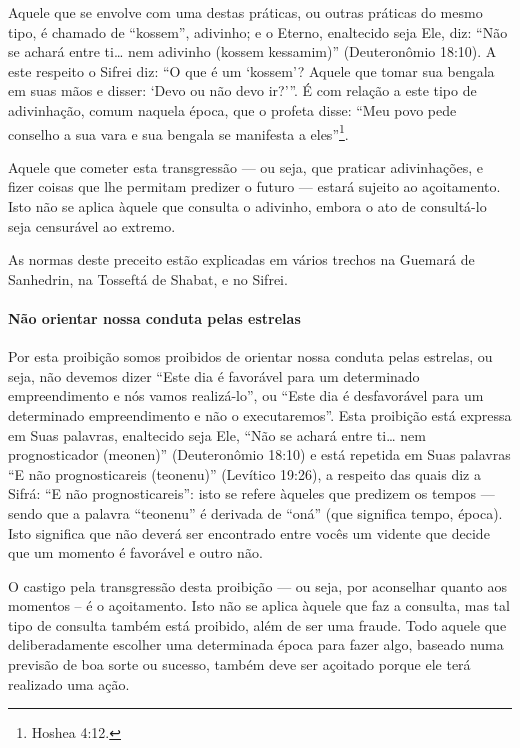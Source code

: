 Aquele que se envolve com uma destas práticas, ou outras práticas do
mesmo tipo, é chamado de ``kossem'', adivinho; e o Eterno, enaltecido
seja Ele, diz: ``Não se achará entre ti\ldots{} nem adivinho (kossem
kessamim)'' (Deuteronômio 18:10). A este respeito o Sifrei diz: ``O que
é um `kossem'? Aquele que tomar sua bengala em suas mãos e disser: `Devo
ou não devo ir?'''. É com relação a este tipo de adivinhação, comum
naquela época, que o profeta disse: ``Meu povo pede conselho a sua vara
e sua bengala se manifesta a eles''\footnote{Hoshea 4:12.}.

Aquele que cometer esta transgressão --- ou seja, que praticar
adivinhações, e fizer coisas que lhe permitam predizer o futuro ---
estará sujeito ao açoitamento. Isto não se aplica àquele que consulta o
adivinho, embora o ato de consultá-lo seja censurável ao extremo.

As normas deste preceito estão explicadas em vários trechos na Guemará
de Sanhedrin, na Tosseftá de Shabat, e no Sifrei.

\paragraph{Não orientar nossa conduta pelas estrelas}

Por esta proibição somos proibidos de orientar nossa conduta pelas
estrelas, ou seja, não devemos dizer ``Este dia é favorável para um
determinado empreendimento e nós vamos realizá-lo'', ou ``Este dia é
desfavorável para um determinado empreendimento e não o executaremos''.
Esta proibição está expressa em Suas palavras, enaltecido seja Ele,
``Não se achará entre ti\ldots{} nem prognosticador (meonen)'' (Deuteronômio
18:10) e está repetida em Suas palavras ``E não prognosticareis
(teonenu)'' (Levítico 19:26), a respeito das quais diz a Sifrá: ``E não
prognosticareis'': isto se refere àqueles que predizem os tempos ---
sendo que a palavra ``teonenu'' é derivada de ``oná'' (que significa
tempo, época). Isto significa que não deverá ser encontrado entre vocês
um vidente que decide que um momento é favorável e outro não.

O castigo pela transgressão desta proibição --- ou seja, por aconselhar
quanto aos momentos -- é o açoitamento. Isto não se aplica àquele que
faz a consulta, mas tal tipo de consulta também está proibido, além de
ser uma fraude. Todo aquele que deliberadamente escolher uma determinada
época para fazer algo, baseado numa previsão de boa sorte ou sucesso,
também deve ser açoitado porque ele terá realizado uma ação.

